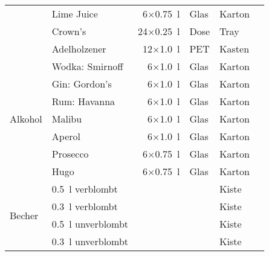 {{\begin{center}
\begin{tabular}{|p{2cm}|lrll|l|}
            & Lime Juice      & 6$\times$\SI{0.75}{\litre}  & Glas & Karton &  \\
            & Crown's         & 24$\times$\SI{0.25}{\litre} & Dose & Tray   &  \\
            & Adelholzener    & 12$\times$\SI{1.0}{\litre}  & PET  & Kasten &  \\
            \hline
            \multirow{7}{*}{Alkohol}
            & Wodka: Smirnoff & 6$\times$\SI{1.0}{\litre}   & Glas & Karton &  \\
            & Gin: Gordon's   & 6$\times$\SI{1.0}{\litre}   & Glas & Karton &  \\
            & Rum: Havanna    & 6$\times$\SI{1.0}{\litre}   & Glas & Karton &  \\
            & Malibu          & 6$\times$\SI{1.0}{\litre}   & Glas & Karton &  \\
            & Aperol          & 6$\times$\SI{1.0}{\litre}   & Glas & Karton &  \\
            & Prosecco        & 6$\times$\SI{0.75}{\litre}  & Glas & Karton &  \\
            & Hugo            & 6$\times$\SI{0.75}{\litre}  & Glas & Karton &  \\
            \hline
            \multirow{4}{*}{Becher}
            & \SI{0.5}{\litre} verblombt &                            &      & Kiste  &  \\
            & \SI{0.3}{\litre} verblombt &                            &      & Kiste  &  \\
            & \SI{0.5}{\litre} unverblombt &                            &      & Kiste  &  \\
            & \SI{0.3}{\litre} unverblombt &                            &      & Kiste  &  \\ \hline
        \end{tabular}
    \end{center}
}
}
